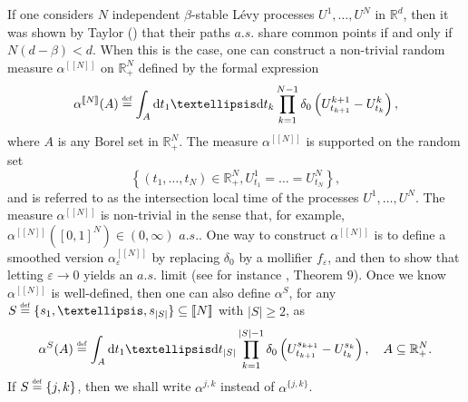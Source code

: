 \documentclass[10pt,a4paper]{amsart}
\newcommand{\RR}{\mathbb R}
\newcommand{\1}{\mathds{1}}
\renewcommand{\d}{\mathrm d}
\newcommand{\eqdef}{\stackrel{\scaleto{\mathrm{def}}{3.5pt}}{=}}
\numberwithin{equation}{section}
\begin{document}
If one considers $N$ independent $\beta$-stable Lévy processes $U^1,\dots,U^N$ in $\RR^d$, then it was shown by Taylor (\cite{TaylorMultPointsStable1966}) that their paths $a.s.$ share common points if and only if $N(d-\beta)<d$. When this is the case, one can construct a non-trivial random measure $\alpha^{[\![N]\!]}$ on $\RR_+^N$ defined by the formal expression
\begin{equation*}
    \alpha^{[\![N]\!]}(A)\eqdef\int_A\d t_1\dots\d t_k\prod_{k=1}^{N-1}\delta_0\left(U_{t_{k+1}}^{k+1}-U_{t_k}^k\right),
\end{equation*}
where $A$ is any Borel set in $\RR_+^N$. The measure $\alpha^{[\![N]\!]}$ is supported on the random set 
\begin{equation*}
    \left\{(t_1,\dots,t_N)\in\RR_+^N, U_{t_1}^1=\dots=U_{t_N}^N\right\},
\end{equation*}
and is referred to as the intersection local time of the processes $U^1,\dots, U^N$. The measure $\alpha^{[\![N]\!]}$ is non-trivial in the sense that, for example, $\alpha^{[\![N]\!]}([0,1]^N)\in(0,\infty)$ $a.s.$. One way to construct $\alpha^{[\![N]\!]}$ is to define a smoothed version $\alpha_\varepsilon^{[\![N]\!]}$ by replacing $\delta_0$ by a mollifier $f_\varepsilon$, and then to show that letting $\varepsilon\rightarrow 0$ yields an $a.s.$ limit (see for instance \cite{ChenRosen2005}, Theorem $9$). Once we know $\alpha^{[\![N]\!]}$ is well-defined, then one can also define $\alpha^S$, for any $S\eqdef\{s_1,\dots,s_{|S|}\}\subseteq[\![N]\!]$ with $|S|\ge2$, as
\begin{equation*}
    \alpha^S(A)\eqdef\int_A\d t_1\dots\d t_{|S|}\prod_{k=1}^{|S|-1}\delta_0\left(U_{t_{k+1}}^{s_{k+1}}-U_{t_k}^{s_k}\right), \quad A\subseteq\RR_+^N.
\end{equation*}
If $S\eqdef\{j,k\}$, then we shall write $\alpha^{j,k}$ instead of $\alpha^{\{j,k\}}$.
\end{document}
